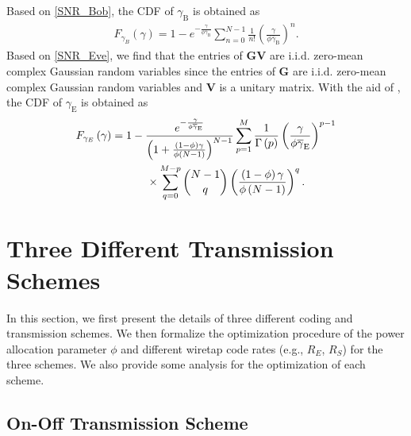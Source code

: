 \documentclass[journal]{IEEEtran}
\begin{document}
Based on \eqref{SNR_Bob}, the CDF of $\gamma_{\textrm{B}}$ is
obtained as
\begin{align}\label{CDF_SNR_Bob}
F_{\gamma_{B}}\left(\gamma\right)=1-e^{-\frac{\gamma}{\phi\overline\gamma_{\textrm{B}}}}
\sum_{n=0}^{N-1}\frac{1}{n!}\left(\frac{\gamma}{\phi\overline\gamma_{\textrm{B}}}\right)^{n}.
\end{align}
Based on \eqref{SNR_Eve}, we find that the entries
of $\mathbf{G}\mathbf{V}$ are i.i.d. zero-mean complex Gaussian
random variables since the entries of $\mathbf{G}$ are i.i.d.
zero-mean complex Gaussian random variables and $\mathbf{V}$ is a
unitary matrix. With the aid of \cite{Gao}, the CDF of
$\gamma_{\textrm{E}}$ is obtained as
\begin{align}\label{CDF_SNR_Eve_MISOME}
F_{\gamma_{E}}\left(\gamma\right)=1&-\frac{e^{-\frac{\gamma}{\phi\overline\gamma_{\textrm{E}}}}}{\left(1+\frac{\left(1-\phi\right)\gamma}{\phi\left(N-1\right)}\right)^{N-1}}
\sum_{p=1}^{M}\frac{1}{\Gamma\left(p\right)}\left(\frac{\gamma}{\phi\overline\gamma_{\textrm{E}}}\right)^{p-1}\notag \\
&~~~~\times \sum_{q=0}^{M-p}{N-1\choose
q}\left(\frac{\left(1-\phi\right)\gamma}{\phi\left(N-1\right)}\right)^{q}.
\end{align}


\section{Three Different Transmission Schemes}

In this section, we first present the details of three different coding and transmission schemes. We then formalize the optimization procedure of the power allocation parameter $\phi$ and different wiretap code rates (e.g., $R_E$, $R_S$) for the three schemes. We also provide some analysis for the optimization of each scheme.

\subsection{On-Off Transmission Scheme}
\end{document}
